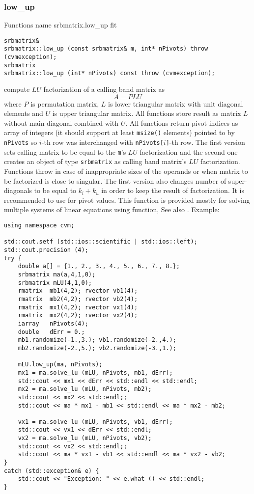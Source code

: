 \subsubsection{low\_up}
Functions%
\pdfdest name {srbmatrix.low_up} fit
\begin{verbatim}
srbmatrix& 
srbmatrix::low_up (const srbmatrix& m, int* nPivots) throw (cvmexception);
srbmatrix
srbmatrix::low_up (int* nPivots) const throw (cvmexception);
\end{verbatim}
compute  $LU$ factorization of a calling band matrix as
\begin{equation*}
A=PLU
\end{equation*}
where $P$ is  permutation matrix, $L$ is  lower
triangular matrix with unit diagonal
elements and $U$ is  upper triangular matrix.
All  functions store  result as  matrix $L$ without
main diagonal combined with $U$. All  functions
return pivot indices as  array of integers
(it should support at least \verb"msize()" elements)
pointed to by \verb"nPivots" so \hbox{$i$-th} row
was interchanged with \hbox{\verb"nPivots["$i$\verb"]"-th} row.
The first version sets  calling matrix to be equal to the
\verb"m"'s $LU$ factorization and the second one
creates an object of type \verb"srbmatrix" as  calling band matrix's
$LU$ factorization.
Functions throw 
in case of inappropriate
sizes of the operands or when  matrix to be factorized is close to
singular. 
The first version also changes number of 
super-diagonals to be equal to $k_l+k_u$
in order to keep the result of factorization.
It is recommended to use 
for pivot values.
This function is provided mostly for solving multiple
systems of linear equations using 
 function,
See also
.
Example:
\begin{Verbatim}
using namespace cvm;

std::cout.setf (std::ios::scientific | std::ios::left); 
std::cout.precision (4);
try {
    double a[] = {1., 2., 3., 4., 5., 6., 7., 8.};
    srbmatrix ma(a,4,1,0);
    srbmatrix mLU(4,1,0);
    rmatrix  mb1(4,2); rvector vb1(4);
    rmatrix  mb2(4,2); rvector vb2(4);
    rmatrix  mx1(4,2); rvector vx1(4);
    rmatrix  mx2(4,2); rvector vx2(4);
    iarray   nPivots(4);
    double   dErr = 0.;
    mb1.randomize(-1.,3.); vb1.randomize(-2.,4.);
    mb2.randomize(-2.,5.); vb2.randomize(-3.,1.);

    mLU.low_up(ma, nPivots);
    mx1 = ma.solve_lu (mLU, nPivots, mb1, dErr);
    std::cout << mx1 << dErr << std::endl << std::endl;
    mx2 = ma.solve_lu (mLU, nPivots, mb2);
    std::cout << mx2 << std::endl;;
    std::cout << ma * mx1 - mb1 << std::endl << ma * mx2 - mb2;

    vx1 = ma.solve_lu (mLU, nPivots, vb1, dErr);
    std::cout << vx1 << dErr << std::endl;
    vx2 = ma.solve_lu (mLU, nPivots, vb2);
    std::cout << vx2 << std::endl;;
    std::cout << ma * vx1 - vb1 << std::endl << ma * vx2 - vb2;
}
catch (std::exception& e) {
    std::cout << "Exception: " << e.what () << std::endl;
}
\end{Verbatim}
